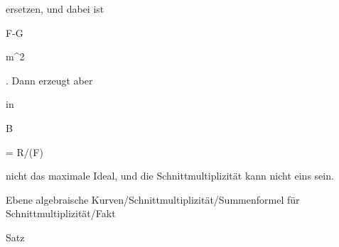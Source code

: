 { ersetzen, und dabei ist


\mavergleichskette

{\vergleichskette

{ F-G
}

{ \in }{ {\mathfrak m}^2
}

{  }{
}

{    }{
}

{   }{
}

}
{}{}{.}
Dann erzeugt aber

 in


\mavergleichskette

{\vergleichskette

{B
}

{ = }{ R/(F)
}

{  }{
}

{    }{
}

{   }{
}

}
{}{}{}
nicht das maximale Ideal, und die Schnittmultiplizität kann nicht eins sein.


}



{Ebene algebraische Kurven/Schnittmultiplizität/Summenformel für Schnittmultiplizität/Fakt}

{Satz}

{}

{


\faktsituation {}



\faktzusatz {}

\faktzusatz {}


}

